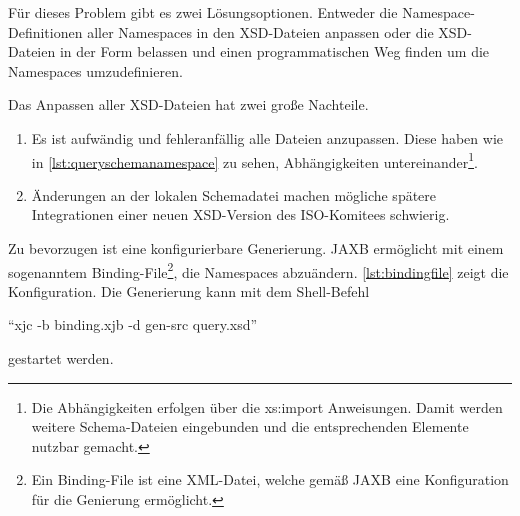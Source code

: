 Für dieses Problem gibt es zwei Lösungsoptionen. Entweder die \gls{Namespace}-Definitionen aller \Glspl{Namespace} in den XSD-Dateien anpassen oder die XSD-Dateien in der Form belassen und einen programmatischen Weg finden um die \Glspl{Namespace} umzudefinieren. 

Das Anpassen aller XSD-Dateien hat zwei große Nachteile.
\begin{enumerate}
\item Es ist aufwändig und fehleranfällig alle Dateien anzupassen. Diese haben wie in \autoref{lst:queryschemanamespace} zu sehen, Abhängigkeiten untereinander\footnote{Die Abhängigkeiten erfolgen über die xs:import Anweisungen. Damit werden weitere Schema-Dateien eingebunden und die entsprechenden Elemente nutzbar gemacht.}.
\item Änderungen an der lokalen Schemadatei machen mögliche spätere Integrationen einer neuen XSD-Version des ISO-Komitees schwierig.
\end{enumerate}

Zu bevorzugen ist eine konfigurierbare Generierung. \gls{JAXB} ermöglicht mit einem sogenanntem Binding-File\footnote{Ein Binding-File ist eine XML-Datei, welche gemäß JAXB eine Konfiguration für die Genierung ermöglicht.}, die \Glspl{Namespace} abzuändern. \autoref{lst:bindingfile} zeigt die Konfiguration. Die Generierung kann mit dem Shell-Befehl 

\enquote{xjc -b binding.xjb -d gen-src query.xsd} 

gestartet werden.  

